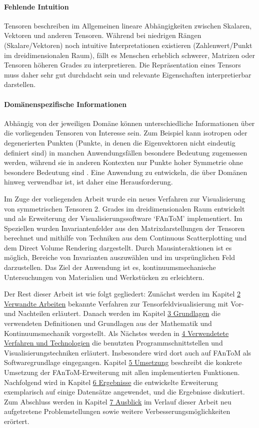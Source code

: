 \documentclass[a4paper,fontsize=12pt,toc=bib,halfparskip]{scrartcl}
\begin{document}
\paragraph{Fehlende Intuition}
Tensoren beschreiben im Allgemeinen lineare Abh\"angigkeiten zwischen Skalaren, Vektoren und anderen Tensoren. W\"ahrend bei niedrigen R\"angen (Skalare/Vektoren) noch intuitive Interpretationen existieren (Zahlenwert/Punkt im dreidimensionalen Raum), f\"allt es Menschen erheblich schwerer, Matrizen oder Tensoren h\"oheren Grades zu interpretieren. Die Repr\"asentation eines Tensors muss daher sehr gut durchdacht sein und relevante Eigenschaften interpretierbar darstellen.

\paragraph{Dom\"anenspezifische Informationen}
Abh\"angig von der jeweiligen Dom\"ane k\"onnen unterschiedliche Informationen \"uber die vorliegenden Tensoren von Interesse sein.  Zum Beispiel kann isotropen oder degenerierten Punkten (Punkte, in denen die Eigenvektoren nicht eindeutig definiert sind) in manchen Anwendungsf\"allen besondere Bedeutung zugemessen werden, w\"ahrend sie in anderen Kontexten nur Punkte hoher Symmetrie ohne besondere Bedeutung sind \cite[S.~4]{hlawitschka2014top}. Eine Anwendung zu entwickeln, die \"uber Dom\"anen hinweg verwendbar ist, ist daher eine Herausforderung.


Im Zuge der vorliegenden Arbeit wurde ein neues Verfahren zur Visualisierung von symmetrischen Tensoren 2. Grades im dreidimensionalen Raum entwickelt und als Erweiterung der Visualisierungssoftware `FAnToM' implementiert. Im Speziellen wurden Invariantenfelder aus den Matrixdarstellungen der Tensoren berechnet und mithilfe von Techniken aus dem Continuous Scatterplotting und dem Direct Volume Rendering dargestellt. Durch Mausinteraktionen ist es m\"oglich, Bereiche von Invarianten auszuw\"ahlen und im urspr\"unglichen Feld darzustellen. Das Ziel der Anwendung ist es, kontinuumsmechanische Untersuchungen von Materialien und Werkst\"ucken zu erleichtern.

Der Rest dieser Arbeit ist wie folgt gegliedert: Zun\"achst werden im Kapitel \hyperref[sec:Verwandte]{2 Verwandte Arbeiten} bekannte Verfahren zur Tensorfeldvisualisierung mit Vor- und Nachteilen erl\"autert. Danach werden im Kapitel \hyperref[sec:Grundlagen]{3 Grundlagen} die verwendeten Definitionen und Grundlagen aus der Mathematik und Kontinuumsmechanik vorgestellt. Als N\"achstes werden in \hyperref[sec:Technologien]{4 Verwendetete Verfahren und Technologien} die benutzten Programmschnittstellen und Visualisierungstechniken erl\"autert. Insbesondere wird dort auch auf FAnToM als Softwaregrundlage eingegangen. Kapitel \hyperref[sec:Umsetzung]{5 Umsetzung} beschreibt die konkrete Umsetzung der FAnToM-Erweiterung mit allen implementierten Funktionen. Nachfolgend wird in Kapitel \hyperref[sec:Ergebnisse]{6 Ergebnisse} die entwickelte Erweiterung exemplarisch auf einige Datens\"atze angewendet, und die Ergebnisse diskutiert. Zum Abschluss werden in Kapitel \hyperref[sec:Ausblick]{7 Ausblick} im Verlauf dieser Arbeit neu aufgetretene Problemstellungen sowie weitere Verbesserungsm\"oglichkeiten er\"ortert.
 
\end{document}
